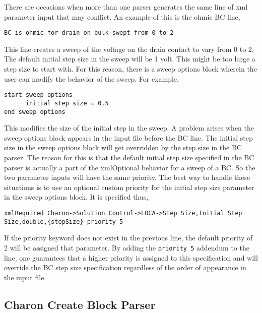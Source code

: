 There are occasions when more than one parser generates the same line
of xml parameter input that may conflict.  An example of this is the
ohmic BC line,
\begin{lstlisting}
BC is ohmic for drain on bulk swept from 0 to 2
\end{lstlisting}
This line creates a sweep of the voltage on the drain contact to vary
from 0 to 2.  The default initial step size in the sweep will be 1
volt.  This might be too large a step size to start with.  For this
reason, there is a sweep options block wherein the user can modify the
behavior of the sweep.  For example,
\begin{lstlisting}
start sweep options
      initial step size = 0.5
end sweep options
\end{lstlisting}
This modifies the size of the initial step in the sweep.  A problem
arises when the sweep options block appears in the input file before
the BC line.  The initial step size in the sweep options block will
get overridden by the step size in the BC parser.  The reason for this
is that the default initial step size specified in the BC parser is
actually a part of the xmlOptional behavior for a sweep of a BC.  So
the two parameter inputs will have the same priority.  The best way to
handle these situations is to use an optional custom priority for the
initial step size parameter in the sweep options block.  It is
specified thus,
\begin{lstlisting}
xmlRequired Charon->Solution Control->LOCA->Step Size,Initial Step Size,double,{stepSize} priority 5
\end{lstlisting}
If the priority keyword does not exist in the previous line, the
default priority of 2 will be assigned that parameter.  By adding the
\texttt{priority 5} addendum to the line, one guarantees that a higher
priority is assigned to this specification and will override the BC
step size specification regardless of the order of appearance in the
input file.

\subsection{Charon Create Block Parser}

